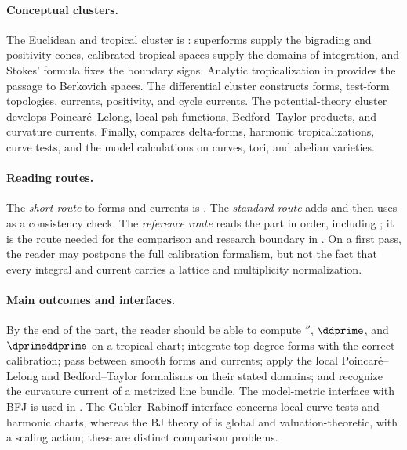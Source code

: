 \paragraph{Conceptual clusters.}
\label{front:part2-conceptual-clusters}
The Euclidean and tropical cluster is
:
superforms supply the bigrading and positivity cones, calibrated tropical
spaces supply the domains of integration, and Stokes' formula fixes the
boundary signs.  Analytic tropicalization in
 provides the passage to Berkovich
spaces.  The differential cluster
 constructs forms, test-form
topologies, currents, positivity, and cycle currents.  The potential-theory
cluster
develops Poincar\'e--Lelong, local psh functions, Bedford--Taylor products,
and curvature currents.  Finally,
 compares delta-forms, harmonic
tropicalizations, curve tests, and the model calculations on curves, tori,
and abelian varieties.

\paragraph{Reading routes.}
\label{front:part2-reading-routes}
The \emph{short route} to forms and currents is
.
The \emph{standard route} adds
and then uses  as a consistency check.  The
\emph{reference route} reads the part in order, including
; it is the route needed for the comparison and
research boundary in
.  On a
first pass, the reader may postpone the full calibration formalism, but not
the fact that every integral and current carries a lattice and multiplicity
normalization.

\paragraph{Main outcomes and interfaces.}
\label{front:part2-main-outcomes-and-interfaces}
By the end of the part, the reader should be able to compute
\(\dprime\), \(\ddprime\), and \(\dprimeddprime\) on a tropical chart; integrate
top-degree forms with the correct calibration; pass between smooth forms and
currents; apply the local Poincar\'e--Lelong and Bedford--Taylor formalisms on
their stated domains; and recognize the curvature current of a metrized line
bundle.  The model-metric interface with BFJ is used in
.  The Gubler--Rabinoff interface concerns local curve
tests and harmonic charts, whereas the BJ theory of  is global
and valuation-theoretic, with a scaling action; these are distinct comparison
problems.

